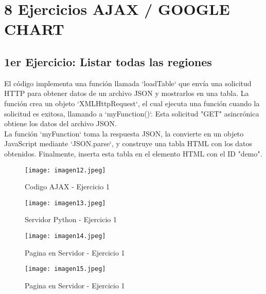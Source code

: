 \documentclass[10pt, a4paper]{article}
\begin{document}
\section*{8 Ejercicios AJAX / GOOGLE CHART}
	\subsection*{1er Ejercicio: Listar todas las regiones}
	\begin{flushleft}
		El código implementa una función llamada `loadTable` que envía una solicitud HTTP para obtener datos de un archivo JSON y mostrarlos en una tabla. La función crea un objeto `XMLHttpRequest`, el cual ejecuta una función cuando la solicitud es exitosa, llamando a `myFunction()`. Esta solicitud "GET" asincrónica obtiene los datos del archivo JSON.\\
		La función `myFunction` toma la respuesta JSON, la convierte en un objeto JavaScript mediante `JSON.parse`, y construye una tabla HTML con los datos obtenidos. Finalmente, inserta esta tabla en el elemento HTML con el ID "demo". 
	\end{flushleft}
	\begin{figure}[h]
		\centering
		\texttt{[image: imagen12.jpeg]}
		\caption{Codigo AJAX - Ejercicio 1}
	\end{figure}
	\begin{figure}[h]
		\centering
		\texttt{[image: imagen13.jpeg]}
		\caption{Servidor Python - Ejercicio 1}
	\end{figure}
	\begin{figure}[h]
		\centering
		\texttt{[image: imagen14.jpeg]}
		\caption{Pagina en Servidor - Ejercicio 1}
	\end{figure}
	\begin{figure}[h]
		\centering
		\texttt{[image: imagen15.jpeg]}
		\caption{Pagina en Servidor - Ejercicio 1}
	\end{figure} 
	 \vspace*{40em}
\end{document}
